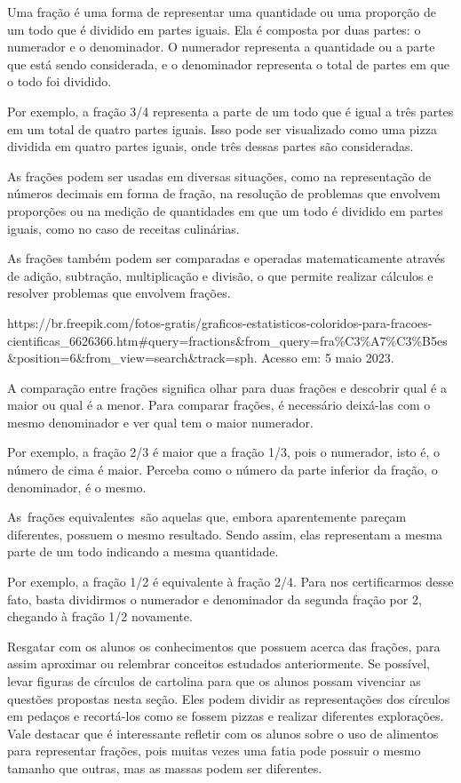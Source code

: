 Uma fração é uma forma de representar uma quantidade ou uma proporção de
um todo que é dividido em partes iguais. Ela é composta por duas partes:
o numerador e o denominador. O numerador representa a quantidade ou a
parte que está sendo considerada, e o denominador representa o total de
partes em que o todo foi dividido.

Por exemplo, a fração 3/4 representa a parte de um todo que é igual a
três partes em um total de quatro partes iguais. Isso pode ser
visualizado como uma pizza dividida em quatro partes iguais, onde três
dessas partes são consideradas.

As frações podem ser usadas em diversas situações, como na representação
de números decimais em forma de fração, na resolução de problemas que
envolvem proporções ou na medição de quantidades em que um todo é
dividido em partes iguais, como no caso de receitas culinárias.

As frações também podem ser comparadas e operadas matematicamente
através de adição, subtração, multiplicação e divisão, o que permite
realizar cálculos e resolver problemas que envolvem frações.

https://br.freepik.com/fotos-gratis/graficos-estatisticos-coloridos-para-fracoes-cientificas\_6626366.htm\#query=fractions\&from\_query=fra\%C3\%A7\%C3\%B5es\&position=6\&from\_view=search\&track=sph.
Acesso em: 5 maio 2023.

A comparação entre frações significa olhar para duas frações e descobrir
qual é a maior ou qual é a menor. Para comparar frações, é necessário
deixá-las com o mesmo denominador e ver qual tem o maior numerador.

Por exemplo, a fração 2/3 é maior que a fração 1/3, pois o numerador,
isto é, o número de cima é maior. Perceba como o número da parte
inferior da fração, o denominador, é o mesmo.

As~frações equivalentes~são aquelas que, embora aparentemente pareçam
diferentes, possuem o mesmo resultado. Sendo assim, elas representam a
mesma parte de um todo indicando a mesma quantidade.

Por exemplo, a fração 1/2 é equivalente à fração 2/4. Para nos
certificarmos desse fato, basta dividirmos o numerador e denominador da
segunda fração por 2, chegando à fração 1/2 novamente.

Resgatar com os alunos os conhecimentos que possuem acerca das frações,
para assim aproximar ou relembrar conceitos estudados anteriormente. Se
possível, levar figuras de círculos de cartolina para que os alunos
possam vivenciar as questões propostas nesta seção. Eles podem dividir
as representações dos círculos em pedaços e recortá-los como se fossem
pizzas e realizar diferentes explorações. Vale destacar que é
interessante refletir com os alunos sobre o uso de alimentos para
representar frações, pois muitas vezes uma fatia pode possuir o mesmo
tamanho que outras, mas as massas podem ser diferentes.

